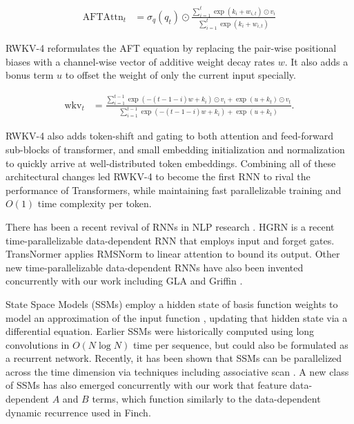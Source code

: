 \begin{align}
\mathrm{AFTAttn}_t &= \sigma_q(q_t) \odot \frac{\sum_{i=1}^{t} \exp(k_i + w_{i,t}) \odot v_i}{\sum_{i=1}^{t} \exp(k_i + w_{i,t})}
\end{align}

RWKV-4 reformulates the AFT equation by replacing the pair-wise positional biases with a channel-wise vector of additive weight decay rates $w$. It also adds a bonus term $u$ to offset the weight of only the current input specially.

\begin{align}
    \mathrm{wkv}_t &= \frac{ \sum_{i=1}^{t-1} \exp(-(t-1-i)w+k_i) \odot v_i + \exp(u+k_t) \odot v_t}{\sum_{i=1}^{t-1} \exp(-(t-1-i)w+k_i) + \exp(u+k_t)}.
\end{align}

RWKV-4 also adds token-shift and gating to both attention and feed-forward sub-blocks of transformer, and small embedding initialization and normalization to quickly arrive at well-distributed token embeddings. Combining all of these architectural changes led RWKV-4 to become the first RNN to rival the performance of Transformers, while maintaining fast parallelizable training and $O(1)$ time complexity per token.

There has been a recent revival of RNNs in NLP research \citep{tiezzi2024resurgence}. HGRN\citep{qin2023hierarchically} is a recent time-parallelizable data-dependent RNN that employs input and forget gates. TransNormer\citep{qin2022deviltransnormer} applies RMSNorm to linear attention to bound its output. Other new time-parallelizable data-dependent RNNs have also been invented concurrently with our work including GLA \citep{yang2023gated} and Griffin \citep{de2024griffin}. 

State Space Models (SSMs) employ a hidden state of basis function weights to model an approximation of the input function \citep{gu2020hippo}, updating that hidden state via a differential equation. Earlier SSMs \citep{gu2022efficiently} were historically computed using long convolutions in $O(N\log N)$ time per sequence, but could also be formulated as a recurrent network. Recently, it has been shown that SSMs can be parallelized across the time dimension via techniques including associative scan \citep{smith2023s5}.  A new class of SSMs has also emerged concurrently with our work \citep{katsch2023gateloop,gu2023mamba} that feature data-dependent $A$ and $B$ terms, which function similarly to the data-dependent dynamic recurrence used in Finch. 

